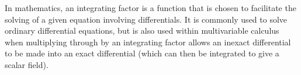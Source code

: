 In mathematics, an integrating factor is a function that is chosen to facilitate the solving of a given equation involving differentials. It is commonly used to solve ordinary differential equations, but is also used within multivariable calculus when multiplying through by an integrating factor allows an inexact differential to be made into an exact differential (which can then be integrated to give a scalar field). 
